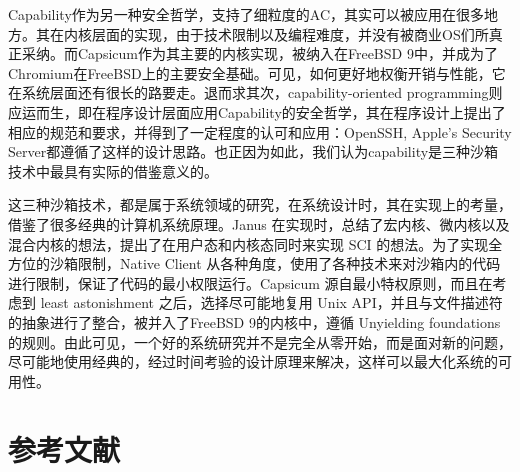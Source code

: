 \documentclass[final,5p,times]{elsarticle}
\begin{document}

Capability作为另一种安全哲学，支持了细粒度的AC，其实可以被应用在很多地方。其在内核层面的实现，由于技术限制以及编程难度，并没有被商业OS们所真正采纳。而Capsicum作为其主要的内核实现，被纳入在FreeBSD 9中，并成为了Chromium在FreeBSD上的主要安全基础。可见，如何更好地权衡开销与性能，它在系统层面还有很长的路要走。退而求其次，capability-oriented programming则应运而生，即在程序设计层面应用Capability的安全哲学，其在程序设计上提出了相应的规范和要求，并得到了一定程度的认可和应用：OpenSSH, Apple's Security Server都遵循了这样的设计思路。也正因为如此，我们认为capability是三种沙箱技术中最具有实际的借鉴意义的。

这三种沙箱技术，都是属于系统领域的研究，在系统设计时，其在实现上的考量，借鉴了很多经典的计算机系统原理。Janus 在实现时，总结了宏内核、微内核以及混合内核的想法，提出了在用户态和内核态同时来实现 SCI 的想法。为了实现全方位的沙箱限制，Native Client 从各种角度，使用了各种技术来对沙箱内的代码进行限制，保证了代码的最小权限运行。Capsicum 源自最小特权原则，而且在考虑到 least astonishment 之后，选择尽可能地复用 Unix API，并且与文件描述符的抽象进行了整合，被并入了FreeBSD 9的内核中，遵循 Unyielding foundations 的规则。由此可见，一个好的系统研究并不是完全从零开始，而是面对新的问题，尽可能地使用经典的，经过时间考验的设计原理来解决，这样可以最大化系统的可用性。


\section*{参考文献}

 

\end{document}
